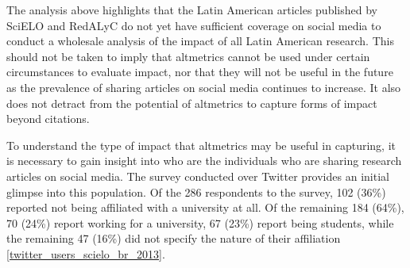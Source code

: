 The analysis above highlights that the Latin American articles published by SciELO and RedALyC do not yet have sufficient coverage on social media to conduct a wholesale analysis of the impact of all Latin American research. This should not be taken to imply that altmetrics cannot be used under certain circumstances to evaluate impact, nor that they will not be useful in the future as the prevalence of sharing articles on social media continues to increase. It also does not detract from the potential of altmetrics to capture forms of impact beyond citations.

To understand the type of impact that altmetrics may be useful in capturing, it is necessary to gain insight into who are the individuals who are sharing research articles on social media. The survey conducted over Twitter provides an initial glimpse into this population. Of the 286 respondents to the survey, 102 (36\%) reported not being affiliated with a university at all. Of the remaining 184 (64\%), 70 (24\%) report working for a university, 67 (23\%) report being students, while the remaining 47 (16\%) did not specify the nature of their affiliation \autoref{twitter_users_scielo_br_2013}.

